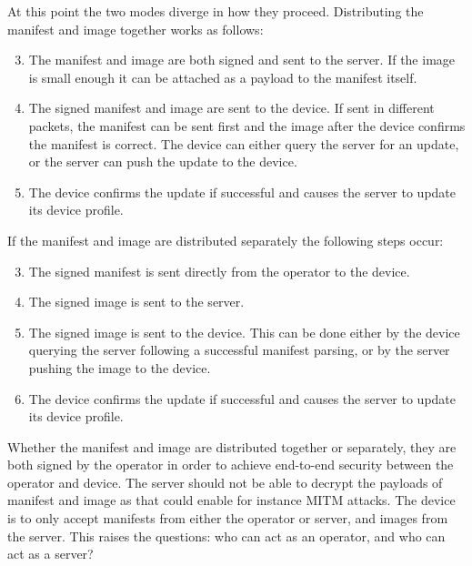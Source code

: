 \documentclass[0-thesis.tex]{subfiles}
\begin{document}
At this point the two modes diverge in how they proceed. Distributing the manifest and
image together works as follows:

\begin{enumerate}[label=0.\arabic*]
    \setcounter{enumi}{2}
    \item The manifest and image are both signed and sent to the server. If the image
            is small enough it can be attached as a payload to the manifest itself.
    \item The signed manifest and image are sent to the device. If sent in different
            packets, the manifest can be sent first and the image after the device confirms the
            manifest is correct. The device can either query the server for an update, or
            the server can push the update to the device.
    \item The device confirms the update if successful and causes the server to update
            its device profile.
\end{enumerate}

If the manifest and image are distributed separately the following steps occur:

\begin{enumerate}[label=1.\arabic*]
    \setcounter{enumi}{2}
    \item The signed manifest is sent directly from the operator to the device.
    \item The signed image is sent to the server.
    \item The signed image is sent to the device. This can be done either by the
        device querying the server following a successful manifest parsing, or by the server
        pushing the image to the device.
    \item The device confirms the update if successful and causes the server to update
    its device profile.
\end{enumerate}

Whether the manifest and image are distributed together or separately, they are both
signed by the operator in order to achieve end-to-end security between the operator and
device. The server should not be able to decrypt the payloads of manifest and image as
that could enable for instance MITM attacks. The device is to only accept manifests from
either the operator or server, and images from the server. This raises the questions: who
can act as an operator, and who can act as a server?


\end{document}
